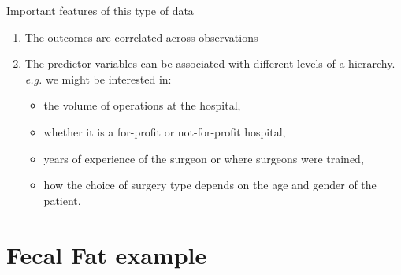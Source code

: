 \documentclass[
  ignorenonframetext,
]{beamer}
\providecommand{\tightlist}{%
  \setlength{\itemsep}{0pt}\setlength{\parskip}{0pt}}
\begin{document}
\begin{frame}{Important features of this type of data}
\protect\hypertarget{important-features-of-this-type-of-data}{}

\begin{enumerate}
\tightlist
\item
  The outcomes are correlated across observations
\item
  The predictor variables can be associated with different levels of a
  hierarchy. \emph{e.g.} we might be interested in:

  \begin{itemize}
  \tightlist
  \item
    the volume of operations at the hospital,
  \item
    whether it is a for-profit or not-for-profit hospital,
  \item
    years of experience of the surgeon or where surgeons were trained,
  \item
    how the choice of surgery type depends on the age and gender of the
    patient.
  \end{itemize}
\end{enumerate}

\end{frame}

\hypertarget{fecal-fat-example}{%
\section{Fecal Fat example}\label{fecal-fat-example}}
\end{document}
